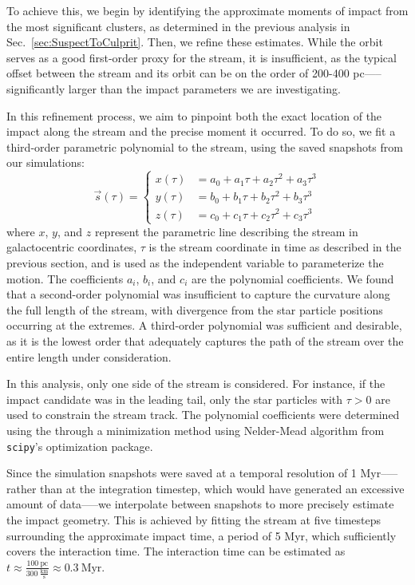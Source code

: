 \documentclass[draft]{aa}
\begin{document}
    To achieve this, we begin by identifying the approximate moments of impact from the most significant clusters, as determined in the previous analysis in Sec.~\ref{sec:SuspectToCulprit}. Then, we refine these estimates. While the orbit serves as a good first-order proxy for the stream, it is insufficient, as the typical offset between the stream and its orbit can be on the order of 200-400 pc—--significantly larger than the impact parameters we are investigating.

    In this refinement process, we aim to pinpoint both the exact location of the impact along the stream and the precise moment it occurred. To do so, we fit a third-order parametric polynomial to the stream, using the saved snapshots from our simulations:
    \begin{equation}
      \vec{s}(\tau) = 
      \left\{
        \begin{aligned}
          x(\tau) &= a_0 + a_1 \tau + a_2 \tau^2 + a_3 \tau^3 \\ 
          y(\tau) &= b_0 + b_1 \tau + b_2 \tau^2 + b_3 \tau^3 \\
          z(\tau) &= c_0 + c_1 \tau + c_2 \tau^2 + c_3 \tau^3
        \end{aligned}
      \right.
      \end{equation}  
    where $x$, $y$, and $z$ represent the parametric line describing the stream in galactocentric coordinates, $\tau$ is the stream coordinate in time as described in the previous section, and is used as the independent variable to parameterize the motion. The coefficients $a_i$, $b_i$, and $c_i$ are the polynomial coefficients. We found that a second-order polynomial was insufficient to capture the curvature along the full length of the stream, with divergence from the star particle positions occurring at the extremes. A third-order polynomial was sufficient and desirable, as it is the lowest order that adequately captures the path of the stream over the entire length under consideration.

    In this analysis, only one side of the stream is considered. For instance, if the impact candidate was in the leading tail, only the star particles with $\tau > 0$ are used to constrain the stream track. The polynomial coefficients were determined using the through a minimization method using Nelder-Mead algorithm from \texttt{scipy}'s optimization package.

    Since the simulation snapshots were saved at a temporal resolution of 1 Myr--—rather than at the integration timestep, which would have generated an excessive amount of data—--we interpolate between snapshots to more precisely estimate the impact geometry. This is achieved by fitting the stream at five timesteps surrounding the approximate impact time, a period of 5 Myr, which sufficiently covers the interaction time. The interaction time can be estimated as $t \approx \frac{100~\text{pc}}{300~\frac{\text{km}}{\text{s}}} \approx 0.3~\text{Myr}$.
\end{document}
